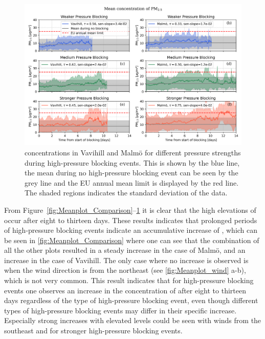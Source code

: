 \begin{figure}[H]
        \centering
        \includegraphics[width=\textwidth]{Figures/Meanplot_pressure.png}
        \caption{\PM concentrations in Vavihill and Malmö for different pressure strengths during high-pressure blocking events. This is shown by the blue line, the mean during no high-pressure blocking event can be seen by the grey line and the EU annual mean limit is displayed by the red line. The shaded regions indicates the standard deviation of the data.}
        \label{fig:Meanplot_pressure}
\end{figure}
 

From Figure~\ref{fig:Meanplot_Comparison}--\ref{fig:Meanplot_pressure} it is clear that the high elevations of \PM occur after eight to thirteen days. These results indicates that prolonged periods of high-pressure blocking events indicate an accumulative increase of \PM, which can be seen in \autoref{fig:Meanplot_Comparison} where one can see that the combination of all the other plots resulted in a steady increase in the case of Malmö, and an increase in the case of Vavihill. The only case where no increase is observed is when the wind direction is from the northeast (see \autoref{fig:Meanplot_wind} a-b), which is not very common. This result indicates that for high-pressure blocking events one observes an increase in the concentration of \PM after eight to thirteen days regardless of the type of high-pressure blocking event, even though different types of high-pressure blocking events may differ in their specific increase. Especially strong increases with elevated \PM levels could be seen with winds from the southeast and for stronger high-pressure blocking events. 

